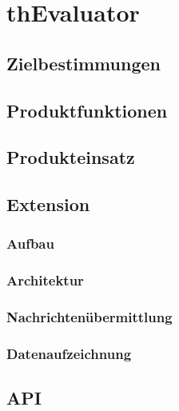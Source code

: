 


\chapter{thEvaluator}
	\section{Zielbestimmungen}
	\section{Produktfunktionen}
	\section{Produkteinsatz}
	\section{Extension}
		\subsection{Aufbau}
		\subsection{Architektur}
		\subsection{Nachrichtenübermittlung}
		\subsection{Datenaufzeichnung}
	\section{API}
